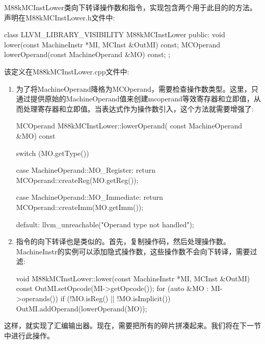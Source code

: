 M88kMCInstLower类向下转译操作数和指令，实现包含两个用于此目的的方法。声明在M88kMCInstLower.h文件中:

\begin{cpp}
class LLVM_LIBRARY_VISIBILITY M88kMCInstLower {
public:
    void lower(const MachineInstr *MI, MCInst &OutMI) const;
    MCOperand lowerOperand(const MachineOperand &MO) const;
};
\end{cpp}

该定义在M88kMCInstLower.cpp文件中:

\begin{enumerate}
\item
为了将MachineOperand降格为MCOperand，需要检查操作数类型。这里，只通过提供原始的MachineOperand值来创建mcoperand等效寄存器和立即值，从而处理寄存器和立即值。当表达式作为操作数引入，这个方法就需要增强了:

\begin{cpp}
MCOperand M88kMCInstLower::lowerOperand(
        const MachineOperand &MO) const {
    switch (MO.getType()) {
    case MachineOperand::MO_Register:
        return MCOperand::createReg(MO.getReg());

    case MachineOperand::MO_Immediate:
        return MCOperand::createImm(MO.getImm());

    default:
        llvm_unreachable("Operand type not handled");
    }
}
\end{cpp}

\item
指令的向下转译也是类似的。首先，复制操作码，然后处理操作数。MachineInstr的实例可以添加隐式操作数，这些操作数不会向下转译，需要过滤:

\begin{cpp}
void M88kMCInstLower::lower(const MachineInstr *MI,
MCInst &OutMI) const {
    OutMI.setOpcode(MI->getOpcode());
    for (auto &MO : MI->operands()) {
        if (!MO.isReg() || !MO.isImplicit())
            OutMI.addOperand(lowerOperand(MO));
    }
}
\end{cpp}
\end{enumerate}

这样，就实现了汇编输出器。现在，需要把所有的碎片拼凑起来。我们将在下一节中进行此操作。



















































